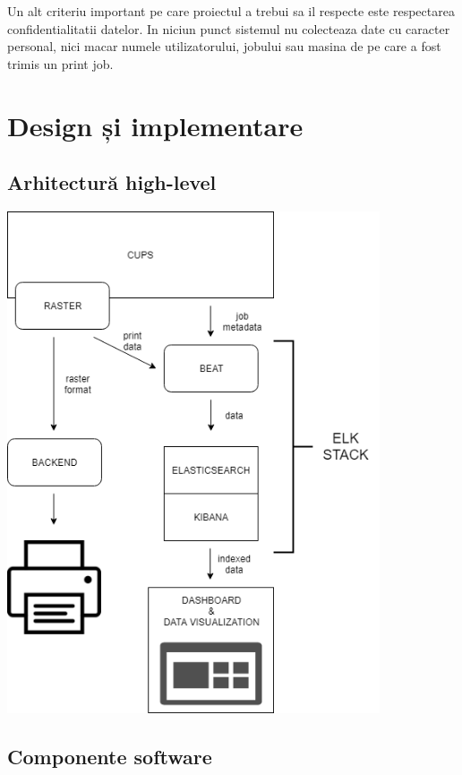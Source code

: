 \documentclass[12pt]{report}
\begin{document}
Un alt criteriu important pe care proiectul a trebui sa il respecte este respectarea confidentialitatii datelor. In niciun punct sistemul nu colecteaza date cu caracter personal, nici macar numele utilizatorului, jobului sau masina de pe care a fost trimis un print job. 

\chapter{Design și implementare}

	\section{Arhitectură high-level}
		\begin{center}
			{\includegraphics[width=110mm]{cups.png}}
		\end{center}
	\section{Componente software}
\end{document}
